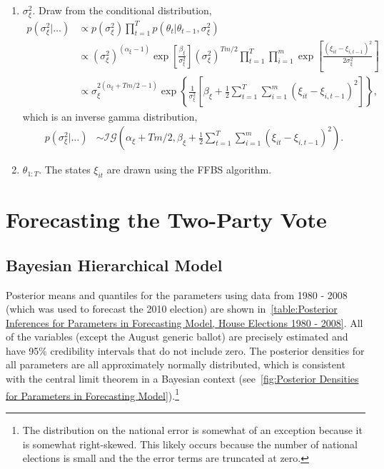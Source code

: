 \documentclass[12pt,final,fleqn]{article}
\theoremstyle{plain}
\begin{document}
\begin{enumerate}
\item $\sigma_\xi^2$. Draw from the conditional distribution,
\begin{align}
p(\sigma_\xi^2|\ldots)&\propto p(\sigma_\xi^2) \prod_{t=1}^T p(\theta_{t}|\theta_{t-1}, \sigma_\xi^2) \\
&\propto (\sigma_\xi^2)^{(\alpha_\xi - 1)}\exp\left[\frac{\beta_\xi}{\sigma_\xi^2}\right](\sigma_\xi^2)^{Tm/2} \prod_{t=1}^T \prod_{i=1}^m \exp\left[\frac{(\xi_{it} - \xi_{i,t-1})^2}{2\sigma_\xi^2}\right]\\
&\propto \sigma_\xi^{2(\alpha_\xi + Tm/2 - 1)}\exp\left\{\frac{1}{\sigma_\xi^2}\left[\beta_\xi + \frac{1}{2}\sum_{t=1}^T \sum_{i=1}^m (\xi_{it} - \xi_{i,t-1})^2\right]\right\},
\end{align}
which is an inverse gamma distribution,
\begin{align}
p(\sigma_\xi^2|\ldots)&\sim \mathcal{IG}\left(\alpha_\xi + Tm/2, \beta_\xi + \frac{1}{2}\sum_{t=1}^T \sum_{i=1}^m (\xi_{it} - \xi_{i,t-1})^2  \right).
\end{align}
\item $\theta_{1:T}$. The states $\xi_{it}$ are drawn using the FFBS algorithm.
\end{enumerate}

\section{Forecasting the Two-Party Vote}
\subsection{Bayesian Hierarchical Model}
Posterior means and quantiles for the parameters using data from 1980 - 2008 (which was used to forecast the 2010 election) are shown in~\autoref{table:Posterior Inferences for Parameters in Forecasting Model, House Elections 1980 - 2008}. All of the variables (except the August generic ballot) are precisely estimated and have 95\% credibility intervals that do not include zero. The posterior densities for all parameters are all approximately normally distributed,  which is consistent with the central limit theorem in a Bayesian context (see~\autoref{fig:Posterior Densities for Parameters in Forecasting Model}).\footnote{The distribution on the national error is somewhat of an exception because it is somewhat right-skewed. This likely occurs because the number of national elections is small and the the error terms are truncated at zero.}
\end{document}
